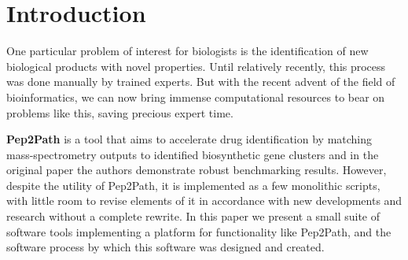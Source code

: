 \documentclass{l4proj}
\newcommand{\cit}[1]{\citep{#1}}
\begin{document}
%
%
%
%
%
%
%
\chapter{Introduction}


One particular problem of interest for biologists is the identification of new biological products with novel properties. Until relatively recently, this process was done manually by trained experts. But with the recent advent of the field of bioinformatics, we can now bring immense computational resources to bear on problems like this, saving precious expert time.

\textbf{Pep2Path} \cit{p2p} is a tool that aims to accelerate drug identification by matching mass-spectrometry outputs to identified biosynthetic gene clusters and in the original paper the authors demonstrate robust benchmarking results. However, despite the utility of Pep2Path, it is implemented as a few monolithic scripts, with little room to revise elements of it in accordance with new developments and research without a complete rewrite. In this paper we present a small suite of software tools implementing a platform for functionality like Pep2Path, and the software process by which this software was designed and created.
\end{document}
